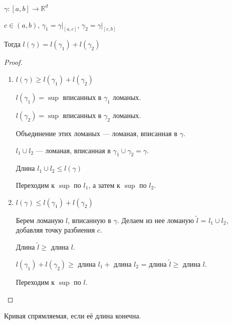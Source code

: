     \begin{theorem}
    
        $\gamma \colon [a, b] \rightarrow \mathbb{R}^d$

        $c \in (a,b)$, $\gamma_1 = \gamma|_{[a,c]}$, $\gamma_2 = \gamma|_{[c,b]}$

        Тогда $l(\gamma) = l(\gamma_1) + l(\gamma_2)$
    
    \end{theorem}

    \begin{proof}
    
        \begin{enumerate}
        
            \item $l(\gamma) \ge l(\gamma_1) + l(\gamma_2)$

            $l(\gamma_1) = \sup$ вписанных в $\gamma_1$ ломаных.

            $l(\gamma_2) = \sup$ вписанных в $\gamma_2$ ломаных.

            Объединение этих ломаных --- ломаная, вписанная в $\gamma$.

            $l_1 \cup l_2$ --- ломаная, вписанная в $\gamma_1 \cup \gamma_2 = \gamma$.

            Длина $l_1 \cup l_2 \le l(\gamma)$

            Переходим к $\sup$ по $l_1$, а затем к $\sup$ по $l_2$.

            \item $l(\gamma) \le l(\gamma_1) + l(\gamma_2)$

            Берем ломаную $l$, вписанную в $\gamma$.
            Делаем из нее ломаную $\widetilde{l}$ = $l_1 \cup l_2$, добавляя точку разбиения $c$. 

            Длина $\widetilde{l} \ge$ длина $l$.

            $l(\gamma_1) + l(\gamma_2) \ge $ длина $l_1 +$ длина $l_2$ = длина $\widetilde{l} \ge$ длина $l$.

            Переходим к $\sup$ по $l$.
        
        \end{enumerate}
    
    \end{proof}

    \begin{Def}
    
        Кривая спрямляемая, если её длина конечна.
    
    \end{Def}

